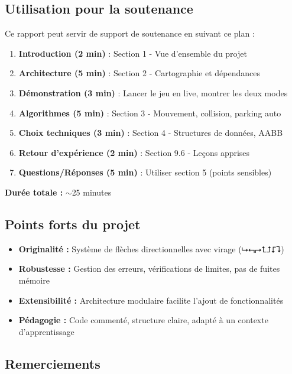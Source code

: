 \documentclass[12pt,a4paper]{article}
\begin{document}
\subsection{Utilisation pour la soutenance}

Ce rapport peut servir de support de soutenance en suivant ce plan :

\begin{enumerate}
    \item \textbf{Introduction (2 min)} : Section 1 - Vue d'ensemble du projet
    \item \textbf{Architecture (5 min)} : Section 2 - Cartographie et dépendances
    \item \textbf{Démonstration (3 min)} : Lancer le jeu en live, montrer les deux modes
    \item \textbf{Algorithmes (5 min)} : Section 3 - Mouvement, collision, parking auto
    \item \textbf{Choix techniques (3 min)} : Section 4 - Structures de données, AABB
    \item \textbf{Retour d'expérience (2 min)} : Section 9.6 - Leçons apprises
    \item \textbf{Questions/Réponses (5 min)} : Utiliser section 5 (points sensibles)
\end{enumerate}

\textbf{Durée totale :} $\sim$25 minutes

\subsection{Points forts du projet}

\begin{itemize}
    \item \textbf{Originalité :} Système de flèches directionnelles avec virage (⮡⮢⮣⮤⮥⮦⮧)
    \item \textbf{Robustesse :} Gestion des erreurs, vérifications de limites, pas de fuites mémoire
    \item \textbf{Extensibilité :} Architecture modulaire facilite l'ajout de fonctionnalités
    \item \textbf{Pédagogie :} Code commenté, structure claire, adapté à un contexte d'apprentissage
\end{itemize}

\subsection{Remerciements}
\end{document}
